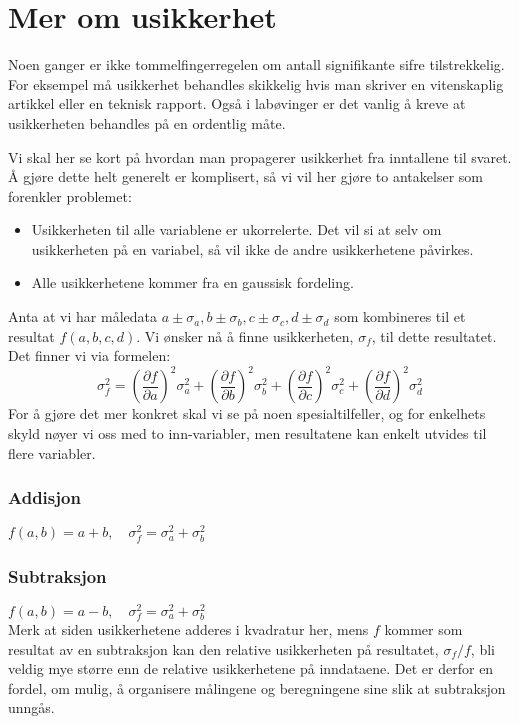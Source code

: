 \section{Mer om usikkerhet}
Noen ganger er ikke tommelfingerregelen om antall signifikante sifre tilstrekkelig. For eksempel må usikkerhet behandles skikkelig hvis man skriver en vitenskaplig artikkel eller en teknisk rapport. Også i labøvinger er det vanlig å kreve at usikkerheten behandles på en ordentlig måte. 

Vi skal her se kort på hvordan man propagerer usikkerhet fra inntallene til svaret. Å gjøre dette helt generelt er komplisert, så vi vil her gjøre to antakelser som forenkler problemet:
\begin{itemize}
\item
Usikkerheten til alle variablene er ukorrelerte. Det vil si at selv om usikkerheten på en variabel, så vil ikke de andre 	usikkerhetene påvirkes.
\item
Alle usikkerhetene kommer fra en gaussisk fordeling. 
\end{itemize}
Anta at vi har måledata $a\pm\sigma_a,b\pm\sigma_b,c\pm\sigma_c,d\pm\sigma_d$ som kombineres til et resultat $f(a,b,c,d)$. Vi ønsker nå å finne usikkerheten, $\sigma_f$, til dette resultatet. Det finner vi via formelen:
\begin{displaymath}
	\sigma_f^2 =
	\left(\frac{\partial f}{\partial a}\right)^2\sigma_a^2 + \left(\frac{\partial f}{\partial b}\right)^2\sigma_b^2 + 
	\left(\frac{\partial f}{\partial c}\right)^2\sigma_c^2 + \left(\frac{\partial f}{\partial d}\right)^2\sigma_d^2 
\end{displaymath}
For å gjøre det mer konkret skal vi se på noen spesialtilfeller, og for enkelhets skyld nøyer vi oss med to inn-variabler, men resultatene kan enkelt utvides til flere variabler.
\subsubsection*{Addisjon}
$f(a,b) = a + b,\quad	\sigma_f^2 = \sigma_a^2 + \sigma_b^2$
\subsubsection*{Subtraksjon}
$f(a,b) = a - b, \quad	\sigma_f^2 = \sigma_a^2 + \sigma_b^2$ \\
Merk at siden usikkerhetene adderes i kvadratur her, mens $f$ kommer som resultat av en subtraksjon kan den relative usikkerheten på resultatet, $\sigma_f/f$, bli veldig mye større enn de relative usikkerhetene på inndataene. Det er derfor en fordel, om mulig, å organisere målingene og beregningene sine slik at subtraksjon unngås.
